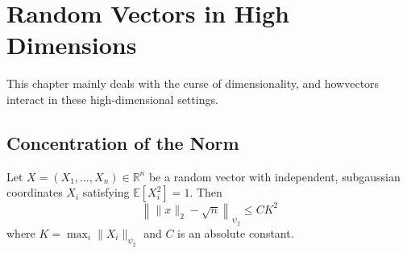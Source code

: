 \section{Random Vectors in High Dimensions}
This chapter mainly deals with the curse of dimensionality, and howvectors interact in these 
high-dimensional settings.

\subsection{Concentration of the Norm}
\begin{theorem}
\label{thm:3.1.1}
Let $X = (X_1, \dots, X_n) \in \mathbb{R}^n$ be a random vector with independent, subgaussian coordinates 
$X_i$ satisfying $\mathbb{E}[X_i^2] = 1$. Then 
\[ \left\lVert \lVert x \rVert_2 - \sqrt{n} \right\rVert_{\psi_2} \leq CK^2 \]
where $K = \max_{i} \lVert X_i \rVert_{\psi_2}$ and $C$ is an absolute constant.
\end{theorem}

